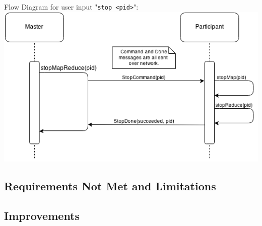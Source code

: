 \documentclass[12pt]{article}
\begin{document}
Flow Diagram for user input "\verb|stop <pid>|": \\
\includegraphics[scale=.7]{MapReduce_stop.png}

\subsection{Requirements Not Met and Limitations}

\subsection{Improvements}
\end{document}
